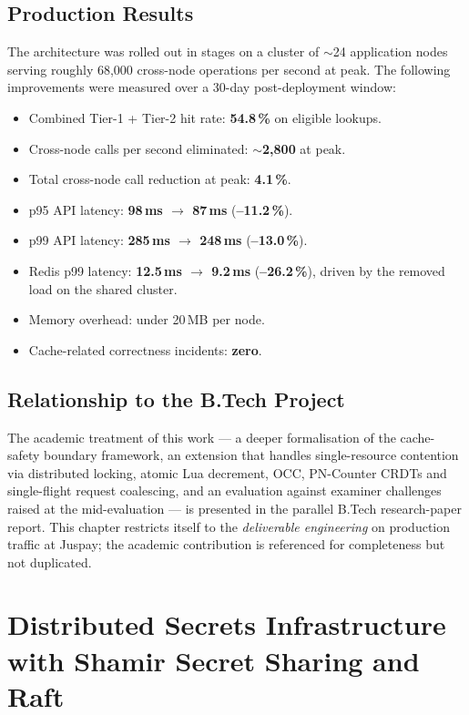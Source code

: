 \documentclass[12pt,a4paper,oneside]{report}
\begin{document}
\section{Production Results}

The architecture was rolled out in stages on a cluster of $\sim$24 application nodes serving roughly 68{,}000 cross-node operations per second at peak. The following improvements were measured over a 30-day post-deployment window:

\begin{itemize}[leftmargin=*]
    \item Combined Tier-1 + Tier-2 hit rate: \textbf{54.8\,\%} on eligible lookups.
    \item Cross-node calls per second eliminated: \textbf{$\sim$2{,}800} at peak.
    \item Total cross-node call reduction at peak: \textbf{4.1\,\%}.
    \item p95 API latency: \textbf{98\,ms $\rightarrow$ 87\,ms} (\textbf{--11.2\,\%}).
    \item p99 API latency: \textbf{285\,ms $\rightarrow$ 248\,ms} (\textbf{--13.0\,\%}).
    \item Redis p99 latency: \textbf{12.5\,ms $\rightarrow$ 9.2\,ms} (\textbf{--26.2\,\%}), driven by the removed load on the shared cluster.
    \item Memory overhead: under 20\,MB per node.
    \item Cache-related correctness incidents: \textbf{zero}.
\end{itemize}

\section{Relationship to the B.Tech Project}

The academic treatment of this work --- a deeper formalisation of the cache-safety boundary framework, an extension that handles single-resource contention via distributed locking, atomic Lua decrement, OCC, PN-Counter CRDTs and single-flight request coalescing, and an evaluation against examiner challenges raised at the mid-evaluation --- is presented in the parallel B.Tech research-paper report. This chapter restricts itself to the \emph{deliverable engineering} on production traffic at Juspay; the academic contribution is referenced for completeness but not duplicated.


\chapter[Distributed Secrets with OpenBao]{Distributed Secrets Infrastructure with Shamir Secret Sharing and Raft}
\label{chap:openbao}
\end{document}
